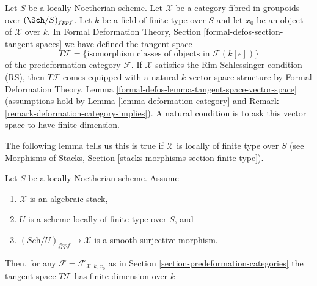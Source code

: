 \noindent
Let $S$ be a locally Noetherian scheme. Let $\mathcal{X}$ be a category
fibred in groupoids over $(\Sch/S)_{fppf}$. Let $k$ be a field of finite
type over $S$ and let $x_0$ be an object of $\mathcal{X}$ over $k$.
In Formal Deformation Theory, Section \ref{formal-defos-section-tangent-spaces}
we have defined the tangent space
\begin{equation}
\label{equation-tangent-space}
T\mathcal{F} =
\{\text{isomorphism classes of objects in }\mathcal{F}(k[\epsilon])\}
\end{equation}
of the predeformation category $\mathcal{F}$. If $\mathcal{X}$ satisfies
the Rim-Schlessinger condition (RS), then $T\mathcal{F}$ comes equipped
with a natural $k$-vector space structure by
Formal Deformation Theory, Lemma
\ref{formal-defos-lemma-tangent-space-vector-space}
(assumptions hold by Lemma \ref{lemma-deformation-category} and
Remark \ref{remark-deformation-category-implies}). A natural condition
is to ask this vector space to have finite dimension.

\medskip\noindent
The following lemma tells us this is true if
$\mathcal{X}$ is locally of finite type over $S$ (see
Morphisms of Stacks, Section \ref{stacks-morphisms-section-finite-type}).

\begin{lemma}
\label{lemma-finite-dimension}
Let $S$ be a locally Noetherian scheme. Assume
\begin{enumerate}
\item $\mathcal{X}$ is an algebraic stack,
\item $U$ is a scheme locally of finite type over $S$, and
\item $(\textit{Sch}/U)_{fppf} \to \mathcal{X}$ is a smooth surjective
morphism.
\end{enumerate}
Then, for any $\mathcal{F} = \mathcal{F}_{\mathcal{X}, k, x_0}$ as in
Section \ref{section-predeformation-categories}
the tangent space $T\mathcal{F}$ has finite dimension over $k$
\end{lemma}

